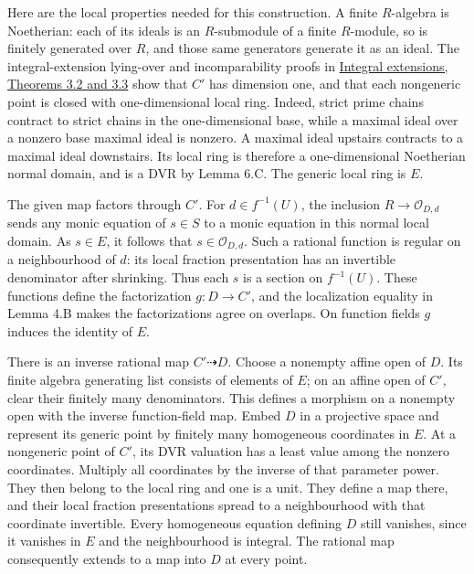 \documentclass[11pt,a4paper,openany]{report}
\newcounter{none}
\begin{document}
Here are the local properties needed for this construction. A finite \(R\)-algebra is Noetherian: each of its ideals is an \(R\)-submodule of a finite \(R\)-module, so is finitely generated over \(R\), and those same generators generate it as an ideal. The integral-extension lying-over and incomparability proofs in \href{https://github.com/KokunoYumeto/open-math-courses/blob/d02d0a3669f42579db037cd44de1d113fdd770a1/docs/courses/AG-CA/src/integral-extensions-lying-over-going-up-and-going-down.md}{Integral extensions, Theorems 3.2 and 3.3} show that \(C'\) has dimension one, and that each nongeneric point is closed with one-dimensional local ring. Indeed, strict prime chains contract to strict chains in the one-dimensional base, while a maximal ideal over a nonzero base maximal ideal is nonzero. A maximal ideal upstairs contracts to a maximal ideal downstairs. Its local ring is therefore a one-dimensional Noetherian normal domain, and is a DVR by Lemma 6.C. The generic local ring is \(E\).

The given map factors through \(C'\). For \(d\in f^{-1}(U)\), the inclusion \(R\to\mathcal O_{D,d}\) sends any monic equation of \(s\in S\) to a monic equation in this normal local domain. As \(s\in E\), it follows that \(s\in\mathcal O_{D,d}\). Such a rational function is regular on a neighbourhood of \(d\): its local fraction presentation has an invertible denominator after shrinking. Thus each \(s\) is a section on \(f^{-1}(U)\). These functions define the factorization \(g:D\to C'\), and the localization equality in Lemma 4.B makes the factorizations agree on overlaps. On function fields \(g\) induces the identity of \(E\).

There is an inverse rational map \(C'\dashrightarrow D\). Choose a nonempty affine open of \(D\). Its finite algebra generating list consists of elements of \(E\); on an affine open of \(C'\), clear their finitely many denominators. This defines a morphism on a nonempty open with the inverse function-field map. Embed \(D\) in a projective space and represent its generic point by finitely many homogeneous coordinates in \(E\). At a nongeneric point of \(C'\), its DVR valuation has a least value among the nonzero coordinates. Multiply all coordinates by the inverse of that parameter power. They then belong to the local ring and one is a unit. They define a map there, and their local fraction presentations spread to a neighbourhood with that coordinate invertible. Every homogeneous equation defining \(D\) still vanishes, since it vanishes in \(E\) and the neighbourhood is integral. The rational map consequently extends to a map into \(D\) at every point.
\end{document}
